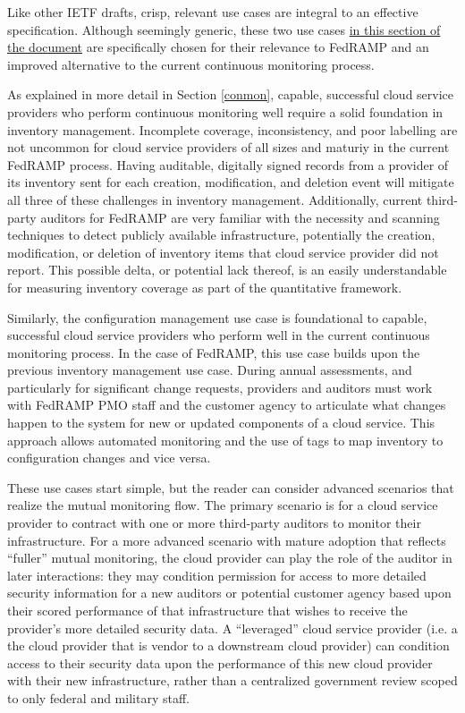 \documentclass{jdf}
\begin{document}
Like other IETF drafts, crisp, relevant use cases are integral to an effective specification. Although seemingly generic, these two use cases \href{https://aj-stein.github.io/conmotion/architecture.html#use-cases}{in this section of the document} are specifically chosen for their relevance to FedRAMP and an improved alternative to the current continuous monitoring process.

As explained in more detail in Section \ref{conmon}, capable, successful cloud service providers who perform continuous monitoring well require a solid foundation in inventory management. Incomplete coverage, inconsistency, and poor labelling are not uncommon for cloud service providers of all sizes and maturiy in the current FedRAMP process. Having auditable, digitally signed records from a provider of its inventory sent for each creation, modification, and deletion event will mitigate all three of these challenges in inventory management. Additionally, current third-party auditors for FedRAMP are very familiar with the necessity and scanning techniques to detect publicly available infrastructure, potentially the creation, modification, or deletion of inventory items that cloud service provider did not report. This possible delta, or potential lack thereof, is an easily understandable for measuring inventory coverage as part of the quantitative framework.

Similarly, the configuration management use case is foundational to capable, successful cloud service providers who perform well in the current continuous monitoring process. In the case of FedRAMP, this use case builds upon the previous inventory management use case. During annual assessments, and particularly for significant change requests, providers and auditors must work with FedRAMP PMO staff and the customer agency to articulate what changes happen to the system for new or updated components of a cloud service. This approach allows automated monitoring and the use of tags to map inventory to configuration changes and vice versa.

These use cases start simple, but the reader can consider advanced scenarios that realize the mutual monitoring flow. The primary scenario is for a cloud service provider to contract with one or more third-party auditors to monitor their infrastructure. For a more advanced scenario with mature adoption that reflects ``fuller'' mutual monitoring, the cloud provider can play the role of the auditor in later interactions: they may condition permission for access to more detailed security information for a new auditors or potential customer agency based upon their scored performance of that infrastructure that wishes to receive the provider's more detailed security data. A ``leveraged'' cloud service provider (i.e. a the cloud provider that is vendor to a downstream cloud provider) can condition access to their security data upon the performance of this new cloud provider with their new infrastructure, rather than a centralized government review scoped to only federal and military staff.
\end{document}

